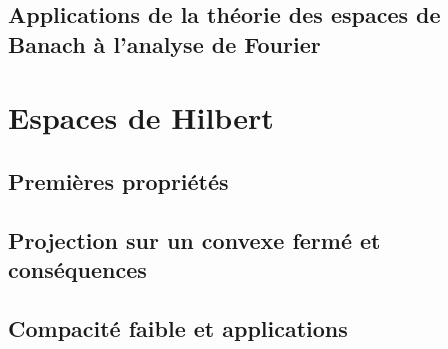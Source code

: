 \documentclass[twocolumn, landscape]{article}
\begin{document}
\subsection{Applications de la théorie des espaces de Banach à l'analyse de Fourier}

\section{Espaces de Hilbert}

\subsection{Premières propriétés}

\subsection{Projection sur un convexe fermé et conséquences}

\subsection{Compacité faible et applications}

\nocite{IPdev}
\printbibliography
\end{document}
